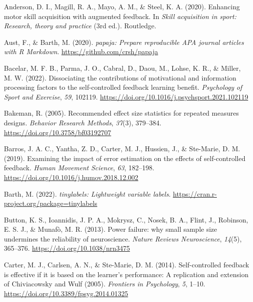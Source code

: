 \documentclass[
  man, donotrepeattitle,floatsintext]{apa7}
\newlength{\cslhangindent}
\newlength{\cslentryspacingunit} %
\newenvironment{CSLReferences}[2] %
 {%
  \setlength{\parindent}{0pt}
  \ifodd #1
  \let\oldpar\par
  \def\par{\hangindent=\cslhangindent\oldpar}
  \fi
  \setlength{\parskip}{#2\cslentryspacingunit}
 }%
 {}
\begin{document}
\hypertarget{refs}{}
\begin{CSLReferences}{1}{0}
\leavevmode{}%
Anderson, D. I., Magill, R. A., Mayo, A. M., \& Steel, K. A. (2020). Enhancing motor skill acquisition with augmented feedback. In \emph{Skill acquisition in sport: Research, theory and practice} (3rd ed.). {Routledge}.

\leavevmode{}%
Aust, F., \& Barth, M. (2020). \emph{{papaja}: {Prepare} reproducible {APA} journal articles with {R Markdown}}. \url{https://github.com/crsh/papaja}

\leavevmode{}%
Bacelar, M. F. B., Parma, J. O., Cabral, D., Daou, M., Lohse, K. R., \& Miller, M. W. (2022). Dissociating the contributions of motivational and information processing factors to the self-controlled feedback learning benefit. \emph{Psychology of Sport and Exercise}, \emph{59}, 102119. \url{https://doi.org/10.1016/j.psychsport.2021.102119}

\leavevmode{}%
Bakeman, R. (2005). Recommended effect size statistics for repeated measures designs. \emph{Behavior Research Methods}, \emph{37}(3), 379--384. \url{https://doi.org/10.3758/bf03192707}

\leavevmode{}%
Barros, J. A. C., Yantha, Z. D., Carter, M. J., Hussien, J., \& Ste-Marie, D. M. (2019). Examining the impact of error estimation on the effects of self-controlled feedback. \emph{Human Movement Science}, \emph{63}, 182--198. \url{https://doi.org/10.1016/j.humov.2018.12.002}

\leavevmode{}%
Barth, M. (2022). \emph{{tinylabels}: Lightweight variable labels}. \url{https://cran.r-project.org/package=tinylabels}

\leavevmode{}%
Button, K. S., Ioannidis, J. P. A., Mokrysz, C., Nosek, B. A., Flint, J., Robinson, E. S. J., \& Munafò, M. R. (2013). Power failure: why small sample size undermines the reliability of neuroscience. \emph{Nature Reviews Neuroscience}, \emph{14}(5), 365--376. \url{https://doi.org/10.1038/nrn3475}

\leavevmode{}%
Carter, M. J., Carlsen, A. N., \& Ste-Marie, D. M. (2014). Self-controlled feedback is effective if it is based on the learner's performance: A replication and extension of {Chiviacowsky} and {Wulf} (2005). \emph{Frontiers in Psychology}, \emph{5}, 1--10. \url{https://doi.org/10.3389/fpsyg.2014.01325}


\end{CSLReferences}
\end{document}
